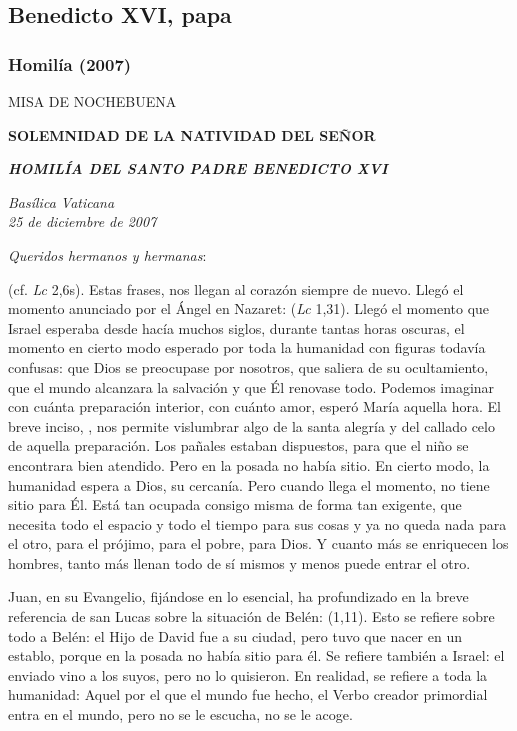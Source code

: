 \subsection{Benedicto XVI, papa}

\subsubsection{Homilía (2007)}

MISA DE NOCHEBUENA

\textbf{SOLEMNIDAD DE LA NATIVIDAD DEL SEÑOR}

\textbf{\emph{HOMILÍA DEL SANTO PADRE BENEDICTO XVI}}

\emph{Basílica Vaticana\\ 25 de diciembre de 2007}



\emph{Queridos hermanos y hermanas}:

 (cf. \emph{Lc} 2,6s). Estas frases, nos llegan al corazón siempre de nuevo. Llegó el momento anunciado por el Ángel en Nazaret:  (\emph{Lc} 1,31). Llegó el momento que Israel esperaba desde hacía muchos siglos, durante tantas horas oscuras, el momento en cierto modo esperado por toda la humanidad con figuras todavía confusas: que Dios se preocupase por nosotros, que saliera de su ocultamiento, que el mundo alcanzara la salvación y que Él renovase todo. Podemos imaginar con cuánta preparación interior, con cuánto amor, esperó María aquella hora. El breve inciso, , nos permite vislumbrar algo de la santa alegría y del callado celo de aquella preparación. Los pañales estaban dispuestos, para que el niño se encontrara bien atendido. Pero en la posada no había sitio. En cierto modo, la humanidad espera a Dios, su cercanía. Pero cuando llega el momento, no tiene sitio para Él. Está tan ocupada consigo misma de forma tan exigente, que necesita todo el espacio y todo el tiempo para sus cosas y ya no queda nada para el otro, para el prójimo, para el pobre, para Dios. Y cuanto más se enriquecen los hombres, tanto más llenan todo de sí mismos y menos puede entrar el otro.

Juan, en su Evangelio, fijándose en lo esencial, ha profundizado en la breve referencia de san Lucas sobre la situación de Belén:  (1,11). Esto se refiere sobre todo a Belén: el Hijo de David fue a su ciudad, pero tuvo que nacer en un establo, porque en la posada no había sitio para él. Se refiere también a Israel: el enviado vino a los suyos, pero no lo quisieron. En realidad, se refiere a toda la humanidad: Aquel por el que el mundo fue hecho, el Verbo creador primordial entra en el mundo, pero no se le escucha, no se le acoge.

